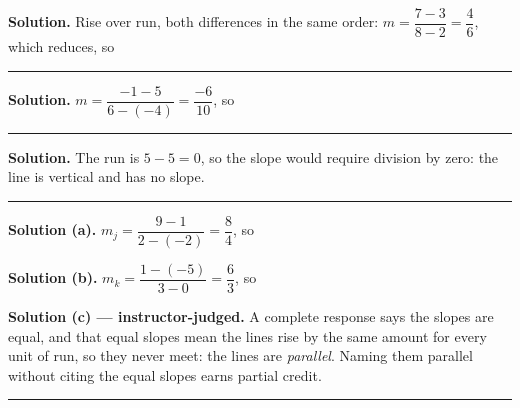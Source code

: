 \documentclass[12pt]{article}
\begin{document}




\noindent\textbf{Solution.} Rise over run, both differences in the same order:
$m = \dfrac{7-3}{8-2} = \dfrac{4}{6}$, which reduces, so 

\vspace{0.15cm}\noindent\rule{\linewidth}{0.2pt}


\noindent\textbf{Solution.} $m = \dfrac{-1-5}{6-(-4)} = \dfrac{-6}{10}$, so

\vspace{0.15cm}\noindent\rule{\linewidth}{0.2pt}


\noindent\textbf{Solution.} The run is $5 - 5 = 0$, so the slope would require
division by zero: the line is vertical and has no slope. 

\vspace{0.15cm}\noindent\rule{\linewidth}{0.2pt}


\noindent\textbf{Solution (a).} $m_j = \dfrac{9-1}{2-(-2)} = \dfrac{8}{4}$, so

\noindent\textbf{Solution (b).} $m_k = \dfrac{1-(-5)}{3-0} = \dfrac{6}{3}$, so

\noindent\textbf{Solution (c) --- instructor-judged.} A complete response says
the slopes are equal, and that equal slopes mean the lines rise by the same
amount for every unit of run, so they never meet: the lines are
\emph{parallel}. Naming them parallel without citing the equal slopes earns
partial credit.

\vspace{0.15cm}\noindent\rule{\linewidth}{0.2pt}

\end{document}
